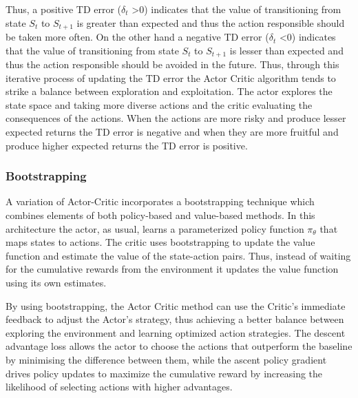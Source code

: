 \documentclass{article}
\begin{document}
Thus, a positive TD error ($\delta_{t}$ \textgreater 0) indicates that the value of transitioning from state $S_t$ to $S_{t+1}$ is greater than expected and thus the action responsible should be taken more often. On the other hand a negative TD error ($\delta_{t}$ \textless 0) indicates that the value of transitioning from state $S_t$ to $S_{t+1}$ is lesser than expected and thus the action responsible should be avoided in the future. Thus, through this iterative process of updating the TD error the Actor Critic algorithm tends to strike a balance between exploration and exploitation. The actor explores the state space and taking more diverse actions and the critic evaluating the consequences of the actions. When the actions are more risky and produce lesser expected returns the TD error is negative and when they are more fruitful and produce higher expected returns the TD error is positive.

\subsubsection{Bootstrapping}
\par A variation of Actor-Critic incorporates a bootstrapping technique which combines elements of both policy-based and value-based methods. In this architecture the actor, as usual, learns a parameterized policy function $\pi_\theta$ that maps states to actions. The critic uses bootstrapping to update the value function and estimate the value of the state-action pairs. Thus, instead of waiting for the cumulative rewards from the environment it updates the value function using its own estimates. 
\par By using bootstrapping, the Actor Critic method can use the Critic's immediate feedback to adjust the Actor's strategy, thus achieving a better balance between exploring the environment and learning optimized action strategies.
The descent advantage loss allows the actor to choose the actions that outperform the baseline by minimising the difference between them, while the ascent policy gradient drives policy updates to maximize the cumulative reward by increasing the likelihood of selecting actions with higher advantages.
\end{document}
